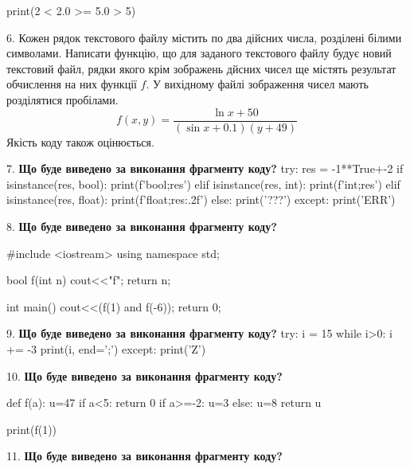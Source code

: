 \documentclass[11pt]{article}
\begin{document}
print(2 < 2.0 >= 5.0 > 5)
\par\vspace{5mm}

6. 
Кожен рядок текстового файлу містить по два дійсних числа, розділені білими символами.
Написати функцію, що для заданого текстового файлу будує новий текстовий файл, рядки якого крім зображень дйсних чисел ще містять результат обчислення на них функції $f$. У вихідному файлі зображення чисел мають розділятися пробілами. 
$$f(x, y) =\frac{\ln x + 50}{(\sin x + 0.1) (y + 49)}$$ 
Якість коду також оцінюється.

\par\vspace{5mm}

7. \textbf{Що буде виведено за виконання фрагменту коду?}
try:
    res = -1**True+-2
    if isinstance(res, bool):
        print(f'bool;{res}')
    elif isinstance(res, int):
        print(f'int;{res}')
    elif isinstance(res, float):
        print(f'float;{res:.2f}')
    else:
        print('???')
except:
    print('ERR')
\par\vspace{5mm}

8. \textbf{Що буде виведено за виконання фрагменту коду?}

#include <iostream>
using namespace std;

bool f(int n){
    cout<<"f";
    return n;
}

int main(){
    cout<<(f(1) and f(-6));
    return 0;
}
\par\vspace{5mm}

9. \textbf{Що буде виведено за виконання фрагменту коду?}
try:
    i = 15
    while i>0:
        i += -3
    print(i, end=';')
except:
    print('Z')
\par\vspace{5mm}

10. \textbf{Що буде виведено за виконання фрагменту коду?}

def f(a):
    u=47
    if a<5: 
        return 0
    if a>=-2:
         u=3
    else:
         u=8
    return u

print(f(1))
\par\vspace{5mm}

11. \textbf{Що буде виведено за виконання фрагменту коду?}
\end{document}
